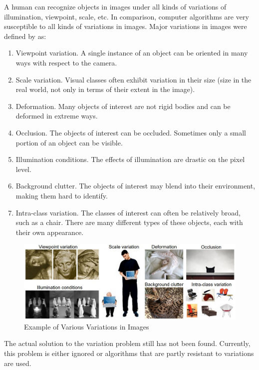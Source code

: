 A human can recognize objects in images under all kinds of variations of illumination, viewpoint, scale, etc. In comparison, computer algorithms are very susceptible to all kinds of variations in images. Major variations in images were defined by \cite{231n} as:

\begin{enumerate}
\item Viewpoint variation. A single instance of an object can be oriented in many ways with respect to the camera.
\item Scale variation. Visual classes often exhibit variation in their size (size in the real world, not only in terms of their extent in the image).
\item Deformation. Many objects of interest are not rigid bodies and can be deformed in extreme ways.
\item Occlusion. The objects of interest can be occluded. Sometimes only a small portion of an object can be visible.
\item Illumination conditions. The effects of illumination are drastic on the pixel level.
\item Background clutter. The objects of interest may blend into their environment, making them hard to identify.
\item Intra-class variation. The classes of interest can often be relatively broad, such as a chair. There are many different types of these objects, each with their own appearance.
\end{enumerate}


 \begin{figure}[h]
\centering
\includegraphics[width=14cm]{Figures/2/challenges.jpeg}
\caption{Example of Various Variations in Images \citep{231n}}
\label{fig:imgnet}
\end{figure}

The actual solution to the variation problem still has not been found. Currently, this problem is either ignored or  algorithms that are partly resistant to variations are used.

